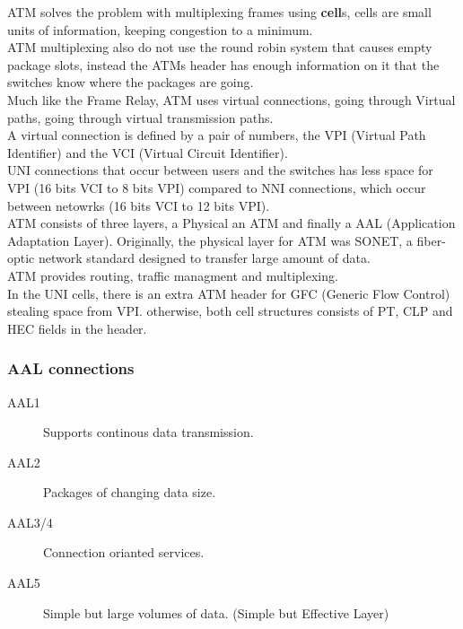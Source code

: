 \documentclass[11pt,a4paper,twoside]{book}
\begin{document}
ATM solves the problem with multiplexing frames using \textbf{cell}s, cells are small units of information, keeping congestion to a minimum.\\

ATM multiplexing also do not use the round robin system that causes empty package slots, instead the ATMs header has enough information on it that the switches know where the packages are going.\\

Much like the Frame Relay, ATM uses virtual connections, going through Virtual paths, going through virtual transmission paths.\\

A virtual connection is defined by a pair of numbers, the VPI (Virtual Path Identifier) and the VCI (Virtual Circuit Identifier).\\

UNI connections that occur between users and the switches has less space for VPI (16 bits VCI to 8 bits VPI) compared to NNI connections, which occur between netowrks (16 bits VCI to 12 bits VPI).\\

ATM consists of three layers, a Physical an ATM and finally a AAL (Application Adaptation Layer). Originally, the physical layer for ATM was SONET, a fiber-optic network standard designed to transfer large amount of data.\\

ATM provides routing, traffic managment and multiplexing.\\

In the UNI cells, there is an extra ATM header for GFC (Generic Flow Control) stealing space from VPI. otherwise, both cell structures consists of PT, CLP and HEC fields in the header.

\subsubsection{AAL connections}

\begin{description}
\item[AAL1] Supports continous data transmission.
\item[AAL2] Packages of changing data size.
\item[AAL3/4] Connection orianted services.
\item[AAL5] Simple but large volumes of data. (Simple but Effective Layer)
\end{description}
\end{document}
